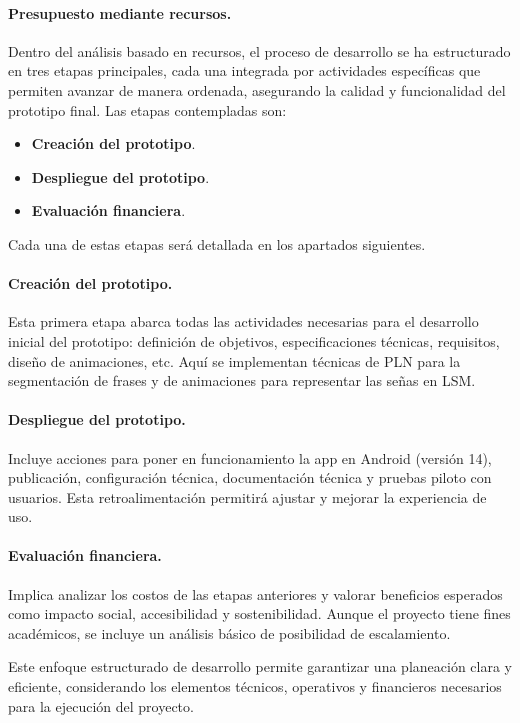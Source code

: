 \paragraph{\textbf{Presupuesto mediante recursos.}} 
Dentro del análisis basado en recursos, el proceso de desarrollo se ha estructurado en tres etapas principales, cada una integrada por actividades específicas que permiten avanzar de manera ordenada, asegurando la calidad y funcionalidad del prototipo final. Las etapas contempladas son:

\begin{itemize}
	\item \textbf{Creación del prototipo}. 
	\item \textbf{Despliegue del prototipo}.
	\item \textbf{Evaluación financiera}. 
\end{itemize}

Cada una de estas etapas será detallada en los apartados siguientes.

\paragraph{\textbf{Creación del prototipo.}} 
Esta primera etapa abarca todas las actividades necesarias para el desarrollo inicial del prototipo: definición de objetivos, especificaciones técnicas, requisitos, diseño de animaciones, etc. Aquí se implementan técnicas de PLN para la segmentación de frases y de animaciones para representar las señas en LSM.

\paragraph{\textbf{Despliegue del prototipo.}} 
Incluye acciones para poner en funcionamiento la app en Android (versión 14), publicación, configuración técnica, documentación técnica y pruebas piloto con usuarios. Esta retroalimentación permitirá ajustar y mejorar la experiencia de uso.

\paragraph{\textbf{Evaluación financiera.}} 
Implica analizar los costos de las etapas anteriores y valorar beneficios esperados como impacto social, accesibilidad y sostenibilidad. Aunque el proyecto tiene fines académicos, se incluye un análisis básico de posibilidad de escalamiento.

Este enfoque estructurado de desarrollo permite garantizar una planeación clara y eficiente, considerando los elementos técnicos, operativos y financieros necesarios para la ejecución del proyecto.

